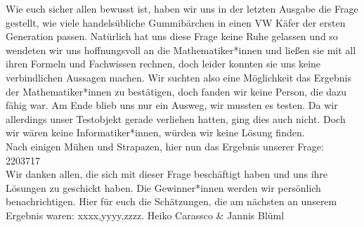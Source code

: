 {Wie euch sicher allen bewusst ist, haben wir uns in der letzten Ausgabe die
Frage gestellt, wie viele handelsübliche Gummibärchen in einen VW Käfer der
ersten Generation passen. Natürlich hat uns diese Frage keine Ruhe gelassen und
so wendeten wir uns hoffnungsvoll an die Mathematiker*innen und ließen sie mit
all ihren Formeln und Fachwissen rechnen, doch leider konnten sie uns keine
verbindlichen Aussagen machen. Wir suchten also eine Möglichkeit das Ergebnis
der Mathematiker*innen zu bestätigen, doch fanden wir keine Person, die dazu
fähig war. Am Ende blieb uns nur ein Ausweg, wir mussten es testen. Da wir
allerdings unser Testobjekt gerade verliehen hatten, ging dies auch nicht. Doch
wir wären keine Informatiker*innen, würden wir keine Lösung finden. \\

Nach einigen Mühen und Strapazen, hier nun das Ergebnis unserer Frage: 2203717 \\

Wir danken allen, die sich mit dieser Frage beschäftigt haben und uns ihre
Lösungen zu geschickt haben. Die Gewinner*innen werden wir persönlich benachrichtigen. Hier für euch die Schätzungen, die am nächsten an unserem Ergebnis waren: xxxx,yyyy,zzzz.}
{Heiko Carassco \& Jannis Blüml}


